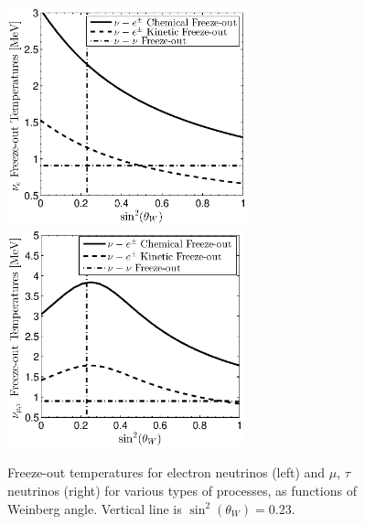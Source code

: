 \begin{figure}
\centerline{\includegraphics[height=6.3cm]{04-birrell/ParametricStudies/Figures/nu_e_freezeout.eps}\hspace{5mm}\includegraphics[height=6.3cm]{04-birrell/ParametricStudies/Figures/nu_mu_freezeout.eps}}
\caption{Freeze-out temperatures for electron neutrinos (left) and $\mu$, $\tau$ neutrinos (right) for various types of processes, as functions of Weinberg angle. Vertical line is $\sin^2(\theta_W)=0.23$. }
\label{fig:freezeoutT_B}
 \end{figure}

